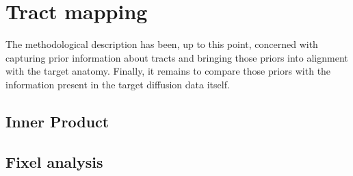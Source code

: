 \section{Tract mapping}
\label{chapterlabel4}


The methodological description has been, up to this point, concerned with capturing
prior information about tracts and bringing those priors into alignment with the target anatomy.
Finally, it remains to compare those priors with the information present in the target diffusion data itself.

\subsection{Inner Product}

\subsection{Fixel analysis}
